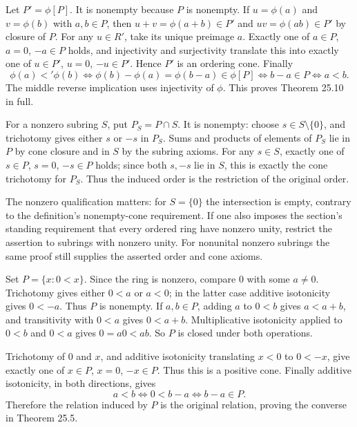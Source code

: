 Let $P'=\phi[P]$. It is nonempty because $P$ is nonempty. If $u=\phi(a)$ and $v=\phi(b)$ with $a,b\in P$, then $u+v=\phi(a+b)\in P'$ and $uv=\phi(ab)\in P'$ by closure of $P$. For any $u\in R'$, take its unique preimage $a$. Exactly one of $a\in P$, $a=0$, $-a\in P$ holds, and injectivity and surjectivity translate this into exactly one of $u\in P'$, $u=0$, $-u\in P'$. Hence $P'$ is an ordering cone. Finally
\[\phi(a)<'\phi(b)\iff\phi(b)-\phi(a)=\phi(b-a)\in\phi[P]
\iff b-a\in P\iff a<b.
\]
The middle reverse implication uses injectivity of $\phi$. This proves Theorem 25.10 in full.

For a nonzero subring $S$, put $P_S=P\cap S$. It is nonempty: choose $s\in S\setminus\{0\}$, and trichotomy gives either $s$ or $-s$ in $P_S$. Sums and products of elements of $P_S$ lie in $P$ by cone closure and in $S$ by the subring axioms. For any $s\in S$, exactly one of $s\in P$, $s=0$, $-s\in P$ holds; since both $s,-s$ lie in $S$, this is exactly the cone trichotomy for $P_S$. Thus the induced order is the restriction of the original order.\par
The nonzero qualification matters: for $S=\{0\}$ the intersection is empty, contrary to the definition's nonempty-cone requirement. If one also imposes the section's standing requirement that every ordered ring have nonzero unity, restrict the assertion to subrings with nonzero unity. For nonunital nonzero subrings the same proof still supplies the asserted order and cone axioms.

Set $P=\{x:0<x\}$. Since the ring is nonzero, compare $0$ with some $a\ne0$. Trichotomy gives either $0<a$ or $a<0$; in the latter case additive isotonicity gives $0<-a$. Thus $P$ is nonempty. If $a,b\in P$, adding $a$ to $0<b$ gives $a<a+b$, and transitivity with $0<a$ gives $0<a+b$. Multiplicative isotonicity applied to $0<b$ and $0<a$ gives $0= a0<ab$. So $P$ is closed under both operations.\par
Trichotomy of $0$ and $x$, and additive isotonicity translating $x<0$ to $0<-x$, give exactly one of $x\in P$, $x=0$, $-x\in P$. Thus this is a positive cone. Finally additive isotonicity, in both directions, gives
\[a<b\iff0<b-a\iff b-a\in P.
\]
Therefore the relation induced by $P$ is the original relation, proving the converse in Theorem 25.5.

